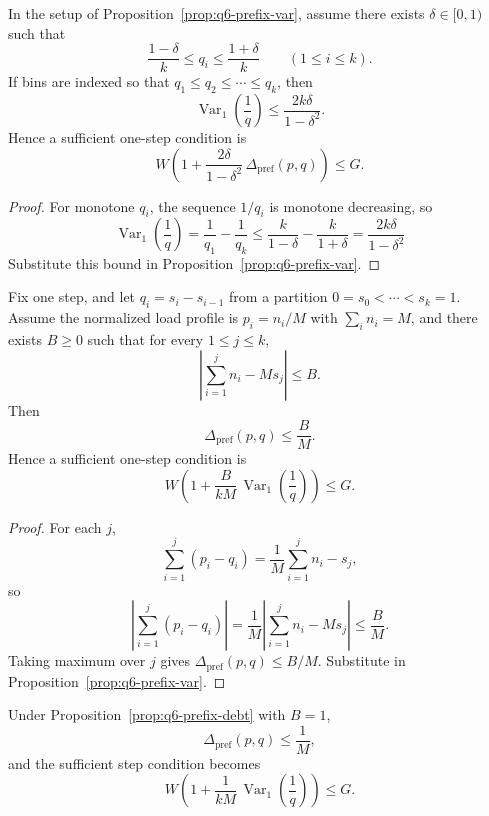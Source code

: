 \begin{corollary}\label{cor:q6-prefix-var-near-uniform}
In the setup of Proposition~\ref{prop:q6-prefix-var}, assume there exists
\(\delta\in[0,1)\) such that
\[
\frac{1-\delta}{k}\le q_i\le \frac{1+\delta}{k}
\qquad (1\le i\le k).
\]
If bins are indexed so that \(q_1\le q_2\le\cdots\le q_k\), then
\[
\operatorname{Var}_1\!\left(\frac1q\right)
\le
\frac{2k\delta}{1-\delta^2}.
\]
Hence a sufficient one-step condition is
\[
W\left(1+\frac{2\delta}{1-\delta^2}\,
\Delta_{\mathrm{pref}}(p,q)\right)\le G.
\]
\end{corollary}

\begin{proof}
For monotone \(q_i\), the sequence \(1/q_i\) is monotone decreasing, so
\[
\operatorname{Var}_1\!\left(\frac1q\right)
=
\frac1{q_1}-\frac1{q_k}
\le
\frac{k}{1-\delta}-\frac{k}{1+\delta}
=
\frac{2k\delta}{1-\delta^2}
\]
Substitute this bound in Proposition~\ref{prop:q6-prefix-var}.
\end{proof}

\begin{proposition}\label{prop:q6-prefix-debt}
Fix one step, and let \(q_i=s_i-s_{i-1}\) from a partition
\(0=s_0<\cdots<s_k=1\).
Assume the normalized load profile is \(p_i=n_i/M\) with
\(\sum_i n_i=M\), and there exists \(B\ge 0\) such that for every
\(1\le j\le k\),
\[
\left|
\sum_{i=1}^j n_i - M s_j
\right|\le B.
\]
Then
\[
\Delta_{\mathrm{pref}}(p,q)\le \frac{B}{M}.
\]
Hence a sufficient one-step condition is
\[
W\left(1+\frac{B}{kM}\,
\operatorname{Var}_1\!\left(\frac1q\right)\right)\le G.
\]
\end{proposition}

\begin{proof}
For each \(j\),
\[
\sum_{i=1}^j (p_i-q_i)
=
\frac1M\sum_{i=1}^j n_i - s_j,
\]
so
\[
\left|\sum_{i=1}^j (p_i-q_i)\right|
=
\frac1M\left|
\sum_{i=1}^j n_i - M s_j
\right|
\le \frac{B}{M}.
\]
Taking maximum over \(j\) gives
\(\Delta_{\mathrm{pref}}(p,q)\le B/M\).
Substitute in Proposition~\ref{prop:q6-prefix-var}.
\end{proof}

\begin{corollary}\label{cor:q6-prefix-debt-one}
Under Proposition~\ref{prop:q6-prefix-debt} with \(B=1\),
\[
\Delta_{\mathrm{pref}}(p,q)\le \frac1M,
\]
and the sufficient step condition becomes
\[
W\left(1+\frac{1}{kM}\,
\operatorname{Var}_1\!\left(\frac1q\right)\right)\le G.
\]
\end{corollary}

